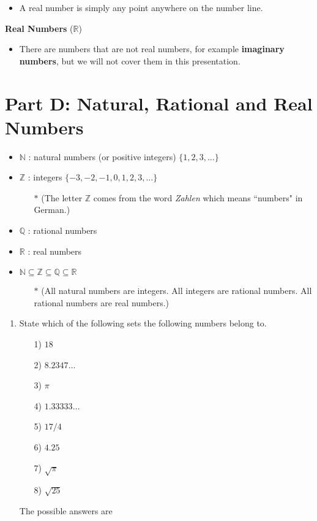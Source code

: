 \documentclass[11pt,a4paper,titlepage,oneside,openany]{article}
\numberwithin{equation}{section}
\numberwithin{algorithm}{section}
\numberwithin{figure}{section}
\numberwithin{table}{section}
\newcommand{\mb}{\mathbb}
\begin{document}
{\begin{itemize}
\item A real number is simply any point anywhere on the number line.
\end{itemize}


\textbf{Real Numbers} ($\mathbb{R}$)
\begin{itemize}
\item There are numbers that are not real numbers, for example \textbf{imaginary numbers}, but we will not cover them in this presentation.
\end{itemize}

\section*{Part D: Natural, Rational and Real Numbers}
\begin{framed}
\begin{itemize}
\item $\mb{N}$ : natural numbers (or positive integers) $\{1,2,3,\ldots\}$
\item $\mb{Z}$ : integers $\{-3,-2,-1,0,1,2,3,\ldots\}$
\begin{itemize}
\item[$\ast$] (The letter $\mb{Z}$ comes from the word \emph{Zahlen} which means ``numbers" in German.)
\end{itemize}
\item $\mb{Q}$ : rational numbers
\item $\mb{R}$ : real numbers
\item $\mb{N} \subseteq \mb{Z } \subseteq \mb{Q} \subseteq \mb{R}$
\begin{itemize}
\item[$\ast$] (All natural numbers are integers. All integers are rational numbers. All rational numbers are real numbers.)
\end{itemize}
\end{itemize}
\end{framed}

\begin{enumerate}
\item State which of the following sets the following numbers belong to. 
  \begin{multicols}{4}
    \begin{itemize}
    \item[1)] $18$
    \item[2)] $8.2347\ldots$
    \item[3)] $\pi$
    \item[4)] $1.33333\ldots$
    \item[5)] $17/4$
    \item[6)] $4.25$
    \item[7)] $\sqrt{\pi}$
    \item[8)] $\sqrt{25}$
    \end{itemize}
  \end{multicols}
  \bigskip
  The possible answers are


\end{enumerate}}
\end{document}

